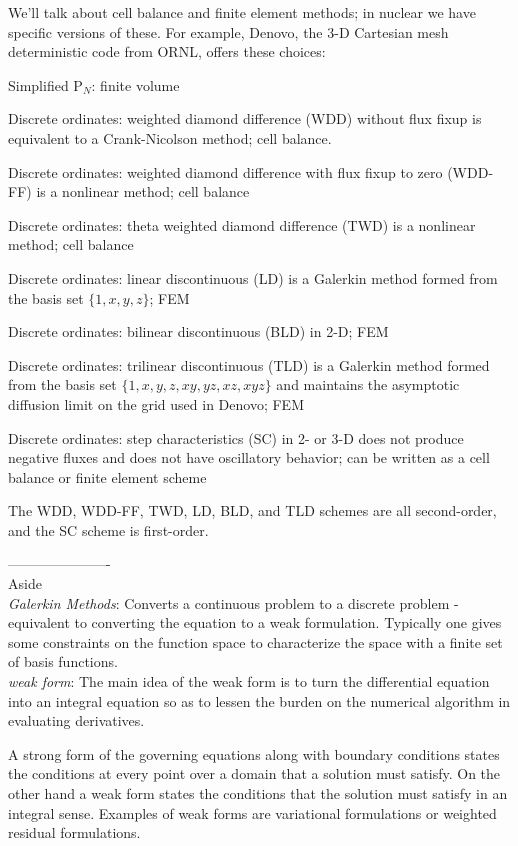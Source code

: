 \documentclass[12pt]{article}
\begin{document}
We'll talk about cell balance and finite element methods; in nuclear we have specific versions of these. For example, Denovo, the 3-D Cartesian mesh deterministic code from ORNL, offers these choices:
\begin{compactitem}
\item Simplified P$_N$: finite volume 
\item Discrete ordinates: weighted diamond difference (WDD) without flux fixup is equivalent to a Crank-Nicolson method; cell balance.
\item Discrete ordinates: weighted diamond difference with flux fixup to zero (WDD-FF)  is a nonlinear method; cell balance 
\item Discrete ordinates: theta weighted diamond difference (TWD)  is a nonlinear method; cell balance
\item Discrete ordinates: linear discontinuous (LD) is a Galerkin method formed from the basis set $\{1,x,y,z\}$; FEM 
\item Discrete ordinates: bilinear discontinuous (BLD) in 2-D; FEM
\item Discrete ordinates: trilinear discontinuous (TLD) is a Galerkin method formed from the basis set $\{1,x,y,z,xy,yz,xz,xyz\}$ and maintains the asymptotic diffusion limit on the grid used in Denovo; FEM
\item Discrete ordinates: step characteristics (SC) in 2- or 3-D does not produce negative fluxes and does not have oscillatory behavior; can be written as a cell balance or finite element scheme
\end{compactitem}
The WDD, WDD-FF, TWD, LD, BLD, and TLD schemes are all second-order, and the SC scheme is first-order.

----------------------\\
Aside\\ 
\emph{Galerkin Methods}: Converts a continuous problem to a discrete problem - equivalent to converting the equation to a weak formulation. Typically one gives some constraints on the function space to characterize the space with a finite set of basis functions.\\

\emph{weak form}: The main idea of the weak form is to turn the differential equation into an integral equation so as to lessen the burden on the numerical algorithm in evaluating derivatives.

A strong form of the governing equations along with boundary conditions states the conditions at every point over a domain that a solution must satisfy. On the other hand a weak form states the conditions that the solution must satisfy in an integral sense. Examples of weak forms are variational formulations or weighted residual formulations. 
\end{document}
